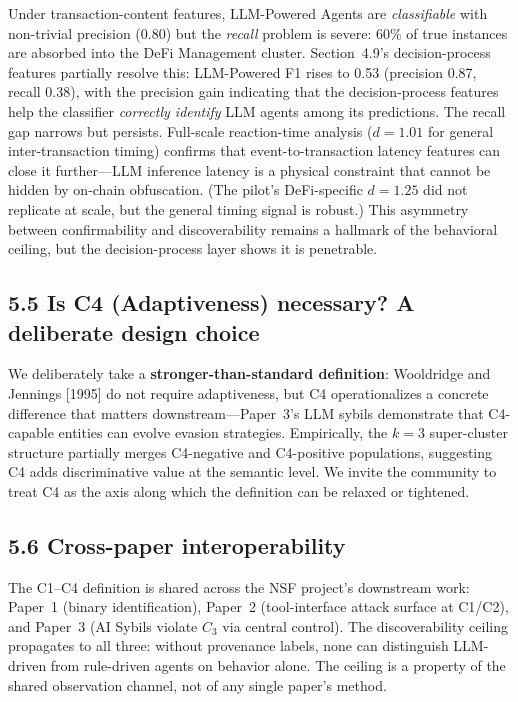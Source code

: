 \documentclass[sigconf,nonacm=false]{acmart}
\begin{document}
Under transaction-content features, LLM-Powered Agents are \emph{classifiable} with non-trivial precision (0.80) but the \emph{recall} problem is severe: 60\% of true instances are absorbed into the DeFi Management cluster. Section~4.9's decision-process features partially resolve this: LLM-Powered F1 rises to 0.53 (precision 0.87, recall 0.38), with the precision gain indicating that the decision-process features help the classifier \emph{correctly identify} LLM agents among its predictions. The recall gap narrows but persists. Full-scale reaction-time analysis ($d{=}1.01$ for general inter-transaction timing) confirms that event-to-transaction latency features can close it further---LLM inference latency is a physical constraint that cannot be hidden by on-chain obfuscation. (The pilot's DeFi-specific $d{=}1.25$ did not replicate at scale, but the general timing signal is robust.) This asymmetry between confirmability and discoverability remains a hallmark of the behavioral ceiling, but the decision-process layer shows it is penetrable.

\subsection{5.5 Is C4 (Adaptiveness) necessary? A deliberate design choice}

We deliberately take a \textbf{stronger-than-standard definition}: Wooldridge and Jennings [1995] do not require adaptiveness, but C4 operationalizes a concrete difference that matters downstream---Paper~3's LLM sybils demonstrate that C4-capable entities can evolve evasion strategies. Empirically, the $k{=}3$ super-cluster structure partially merges C4-negative and C4-positive populations, suggesting C4 adds discriminative value at the semantic level. We invite the community to treat C4 as the axis along which the definition can be relaxed or tightened.

\subsection{5.6 Cross-paper interoperability}

The C1--C4 definition is shared across the NSF project's downstream work: Paper~1 (binary identification), Paper~2 (tool-interface attack surface at C1/C2), and Paper~3 (AI Sybils violate $C_3$ via central control). The discoverability ceiling propagates to all three: without provenance labels, none can distinguish LLM-driven from rule-driven agents on behavior alone. The ceiling is a property of the shared observation channel, not of any single paper's method.
\end{document}
